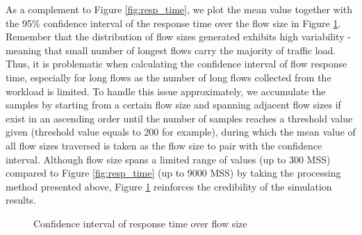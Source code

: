 \documentclass[preprint,12pt]{elsarticle}
\begin{document}
As a complement to Figure \ref{fig:resp_time}, we plot the mean value together with the 95\% confidence interval of the response time over the flow size in Figure \ref{fig:resp_time_ci}. Remember that the distribution of flow sizes generated exhibits high variability - meaning that small number of longest flows carry the majority of traffic load. Thus, it is problematic when calculating the confidence interval of flow response time, especially for long flows as the number of long flows collected from the workload is limited. To handle this issue approximately, we accumulate the samples by starting from a certain flow size and spanning adjacent flow sizes if exist in an ascending order until the number of samples reaches a threshold value given (threshold value equals to 200 for example), during which the mean value of all flow sizes traversed is taken as the flow size to pair with the confidence interval. Although flow size spans a limited range of values (up to 300 MSS) compared to Figure \ref{fig:resp_time} (up to 9000 MSS) by taking the processing method presented above, Figure \ref{fig:resp_time_ci} reinforces the credibility of the simulation results. 

\begin{figure}[ht]
  \centering
  \caption{Confidence interval of response time over flow size}
  \label{fig:resp_time_ci}
\end{figure}
\end{document}

